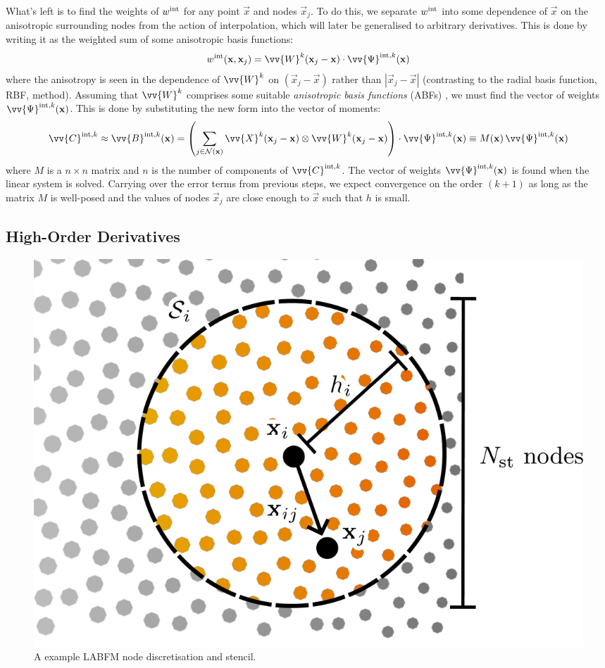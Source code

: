 What's left is to find the weights of $w^{\rm{int}}$ for any point $\vec{x}$ and nodes $\vec{x}_j$. To do this, we separate $w^{\rm{int}}$ into some dependence of $\vec{x}$ on the anisotropic surrounding nodes from the action of interpolation, which will later be generalised to arbitrary derivatives. This is done by writing it as the weighted sum of some anisotropic basis functions:
\begin{equation}
w^{\rm{int}}(\vec{x}, \vec{x}_j) = \vv{W}^k(\vec{x}_j - \vec{x}) \cdot \vv{\Psi}^{\rm{int}, k}(\vec{x})
\end{equation}
where the anisotropy is seen in the dependence of $\vv{W}^k$ on $(\vec{x}_j - \vec{x})$ rather than $|\vec{x}_j - \vec{x}|$ (contrasting to the radial basis function, RBF, method). Assuming that $\vv{W}^k$ comprises some suitable \emph{anisotropic basis functions} (ABFs) \cite{king2022HighorderSimulationsIsothermal}, we must find the vector of weights $\vv{\Psi}^{\rm{int}, k}(\vec{x})$. This is done by substituting the new form into the vector of moments:
\begin{align}
\vv{C}^{\rm{int}, k}
\approx \vv{B}^{\rm{int}, k}(\vec{x})
= \left( \sum_{j \in \cl{N}(\vec{x})} \vv{X}^k (\vec{x}_j - \vec{x}) \otimes \vv{W}^k(\vec{x}_j - \vec{x}) \right) \cdot \vv{\Psi}^{\rm{int}, k}(\vec{x})
\equiv M(\vec{x}) \, \vv{\Psi}^{\rm{int}, k}(\vec{x})
\end{align}
where $M$ is a $n \times n$ matrix and $n$ is the number of components of $\vv{C}^{\rm{int}, k}$. The vector of weights $\vv{\Psi}^{\rm{int}, k}(\vec{x})$ is found when the linear system is solved. Carrying over the error terms from previous steps, we expect convergence on the order $(k + 1)$ as long as the matrix $M$ is well-posed and the values of nodes $\vec{x}_j$ are close enough to $\vec{x}$ such that $h$ is small.


\subsection{High-Order Derivatives}

\begin{figure}[t]
\centering
\includegraphics[scale=0.25]{assets/imgs/labfm-stencil-drawn_simple.pdf}
\caption{A example LABFM node discretisation and stencil.}
\label{fig:labfm-stencil}
\end{figure}

